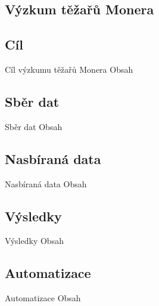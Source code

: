 \documentclass{beamer}
\begin{document}
  \begin{darkframes}
    \section{Výzkum těžařů Monera}
    \subsection{Cíl}
    \begin{frame}{Cíl výzkumu těžařů Monera}
     Obsah
    \end{frame}
    \subsection{Sběr dat}
    \begin{frame}{Sběr dat}
     Obsah
    \end{frame}
    \subsection{Nasbíraná data}
    \begin{frame}{Nasbíraná data}
     Obsah
    \end{frame}
    \subsection{Výsledky}
    \begin{frame}{Výsledky}
     Obsah
    \end{frame}
    \subsection{Automatizace}
    \begin{frame}{Automatizace}
     Obsah
    \end{frame}
  \end{darkframes}
  
    
\end{document}

